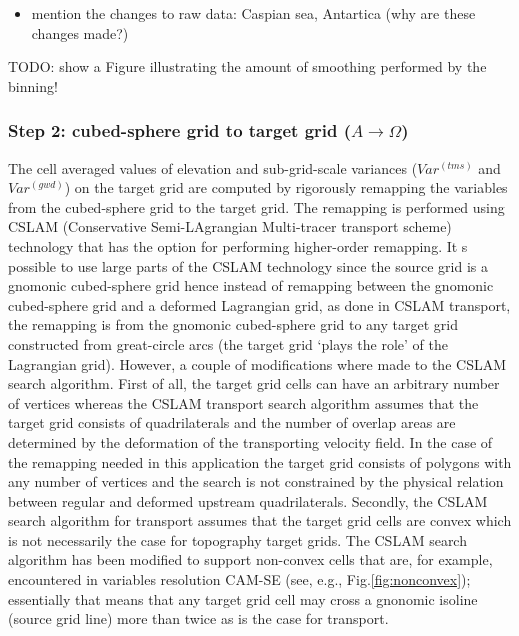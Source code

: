 \documentclass[gmd]{copernicus}
\begin{document}
\begin{itemize}
\item mention the changes to raw data: Caspian sea, Antartica (why are these changes made?)
\end{itemize}

%
%
TODO: show a Figure illustrating the amount of smoothing performed by the binning!
%
\subsubsection{Step 2: cubed-sphere grid to target grid ($A\rightarrow \Omega$)}
The cell averaged values of elevation and sub-grid-scale variances ($Var^{(tms)}$ and $Var^{(gwd)}$) on the target grid are computed by rigorously remapping the variables from the cubed-sphere grid to the target grid.  The remapping is performed using CSLAM (Conservative Semi-LAgrangian Multi-tracer transport scheme) technology \citep{LNU2010JCP} that has the option for performing higher-order remapping. It s possible to use large parts of the CSLAM technology since the source grid is a gnomonic cubed-sphere grid hence instead of remapping between the gnomonic cubed-sphere grid and a deformed Lagrangian grid, as done in CSLAM transport, the remapping is from the gnomonic cubed-sphere grid to any target grid constructed from great-circle arcs (the target grid `plays the role' of the Lagrangian grid). However, a couple of modifications where made to the CSLAM search algorithm. First of all, the target grid cells can have an arbitrary number of vertices whereas the CSLAM transport search algorithm assumes that the target grid consists of quadrilaterals and the number of overlap areas are determined by the deformation of the transporting velocity field. In the case of the remapping needed in this application the target grid consists of polygons with any number of vertices and the search is not constrained by the physical relation between regular and deformed upstream quadrilaterals. Secondly, the CSLAM search algorithm for transport assumes that the target grid cells are convex which is not necessarily the case for topography target grids. The CSLAM search algorithm has been modified to support non-convex cells that are, for example, encountered in variables resolution CAM-SE (see, e.g., Fig.\ref{fig:nonconvex}); essentially that means that any target grid cell may cross a gnonomic isoline (source grid line) more than twice as is the case for transport.
\end{document}
